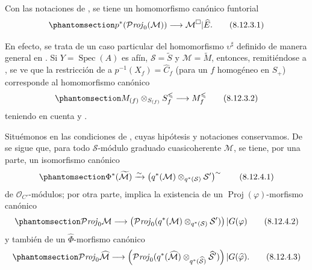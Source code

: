 \documentclass[oneside,10pt]{amsart}
\makeatletter
\renewcommand{\leq}{\leqslant}
\newcommand{\ega@arrow}[2]{\mathchoice{#1}{#2}{#2}{#2}}
\renewcommand{\to}{\ega@arrow{\longrightarrow}{\rightarrow}}
\let\EGAOriginalLabel\label
\renewcommand{\label}[1]{\phantomsection\EGAOriginalLabel{#1}}
\makeatother
\begin{document}
\begin{env}[8.12.3]
\label{II.8.12.3-fr}
Con las notaciones de , se tiene un homomorfismo canónico funtorial
\begin{equation}
\label{II.8.12.3.1-fr}
  p^*(\mathcal{P}\mathit{roj}_0(\mathcal{M}))
  \to\mathcal{M}^{\square}|\widehat{E}.
\tag{8.12.3.1}
\end{equation}

En efecto, se trata de un caso particular del homomorfismo $\upsilon^{\sharp}$ definido de manera general en .
Si $Y=\operatorname{Spec}(A)$ es afín, $\mathcal{S}=\widetilde{S}$ y $\mathcal{M}=\widetilde{M}$, entonces, remitiéndose a , se ve que la restricción de  a $p^{-1}(X_f)=\widehat{C}_f$ (para un $f$ homogéneo en $S_+$) corresponde al homomorfismo canónico
\begin{equation}
\label{II.8.12.3.2-fr}
  M_{(f)}\otimes_{S_{(f)}}S_f^{\leq}\to M_f^{\leq}
\tag{8.12.3.2}
\end{equation}
teniendo en cuenta  y .
\end{env}

\begin{env}[8.12.4]
\label{II.8.12.4-fr}
Situémonos en las condiciones de , cuyas hipótesis y notaciones conservamos.
De  se sigue que, para todo $\mathcal{S}$-módulo graduado cuasicoherente $\mathcal{M}$, se tiene, por una parte, un isomorfismo canónico
\begin{equation}
\label{II.8.12.4.1-fr}
  \Phi^*(\widetilde{\mathcal{M}})
  \xrightarrow{\sim}
  \left(q^*(\mathcal{M})\otimes_{q^*(\mathcal{S})}\mathcal{S}'\right)^{\sim}
\tag{8.12.4.1}
\end{equation}
de $\mathcal{O}_{C'}$-módulos;
por otra parte,  implica la existencia de un $\operatorname{Proj}(\varphi)$-morfismo canónico
\begin{equation}
\label{II.8.12.4.2-fr}
  \mathcal{P}\mathit{roj}_0\mathcal{M}\to
  \left(\mathcal{P}\mathit{roj}_0
  (q^*(\mathcal{M})\otimes_{q^*(\mathcal{S})}\mathcal{S}')\right)
  |G(\varphi)
\tag{8.12.4.2}
\end{equation}
y también de un $\widehat{\Phi}$-morfismo canónico
\begin{equation}
\label{II.8.12.4.3-fr}
  \mathcal{P}\mathit{roj}_0\widehat{\mathcal{M}}\to
  \left(\mathcal{P}\mathit{roj}_0
  (q^*(\widehat{\mathcal{M}})
  \otimes_{q^*(\widehat{\mathcal{S}})}\widehat{\mathcal{S}}')\right)
  |G(\widehat{\varphi}).
\tag{8.12.4.3}
\end{equation}
\end{env}
\end{document}
